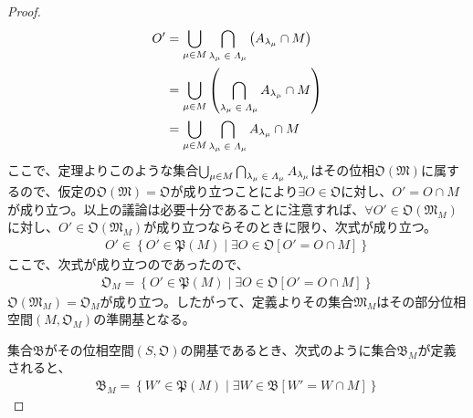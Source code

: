 \documentclass[dvipdfmx]{jsarticle}
\begin{document}
\begin{proof}
\begin{align*}
O' &= \bigcup_{\mu \in M} {\bigcap_{\scriptsize \begin{matrix}
\lambda_{\mu} \in \varLambda_{\mu} \\
\end{matrix}} \left( A_{\lambda_{\mu}} \cap M \right)}\\
&= \bigcup_{\mu \in M} \left( \bigcap_{\scriptsize \begin{matrix}
\lambda_{\mu} \in \varLambda_{\mu} \\
\end{matrix}} A_{\lambda_{\mu}} \cap M \right)\\
&= \bigcup_{\mu \in M} {\bigcap_{\scriptsize \begin{matrix}
\lambda_{\mu} \in \varLambda_{\mu} \\
\end{matrix}} A_{\lambda_{\mu}}} \cap M
\end{align*}
ここで、定理よりこのような集合$\bigcup_{\mu \in M} {\bigcap_{\scriptsize \begin{matrix}
\lambda_{\mu} \in \varLambda_{\mu} \\
\end{matrix}} A_{\lambda_{\mu}}}$はその位相$\mathfrak{O}\left( \mathfrak{M} \right)$に属するので、仮定の$\mathfrak{O}\left( \mathfrak{M} \right) = \mathfrak{O}$が成り立つことにより$\exists O \in \mathfrak{O}$に対し、$O' = O \cap M$が成り立つ。以上の議論は必要十分であることに注意すれば、$\forall O'\in \mathfrak{O}\left( \mathfrak{M}_{M} \right)$に対し、$O'\in \mathfrak{O}\left( \mathfrak{M}_{M} \right)$が成り立つならそのときに限り、次式が成り立つ。
\begin{align*}
O' \in \left\{ O'\in \mathfrak{P}(M) \middle| \exists O \in \mathfrak{O}\left[ O' = O \cap M \right] \right\}
\end{align*}
ここで、次式が成り立つのであったので、
\begin{align*}
\mathfrak{O}_{M} = \left\{ O'\in \mathfrak{P}(M) \middle| \exists O \in \mathfrak{O}\left[ O' = O \cap M \right] \right\}
\end{align*}
$\mathfrak{O}\left( \mathfrak{M}_{M} \right) = \mathfrak{O}_{M}$が成り立つ。したがって、定義よりその集合$\mathfrak{M}_{M}$はその部分位相空間$\left( M,\mathfrak{O}_{M} \right)$の準開基となる。\par
集合$\mathfrak{B}$がその位相空間$\left( S,\mathfrak{O} \right)$の開基であるとき、次式のように集合$\mathfrak{B}_{M}$が定義されると、
\begin{align*}
\mathfrak{B}_{M} = \left\{ W'\in \mathfrak{P}(M) \middle| \exists W \in \mathfrak{B}\left[ W' = W \cap M \right] \right\}

\end{align*}
\end{proof}
\end{document}
